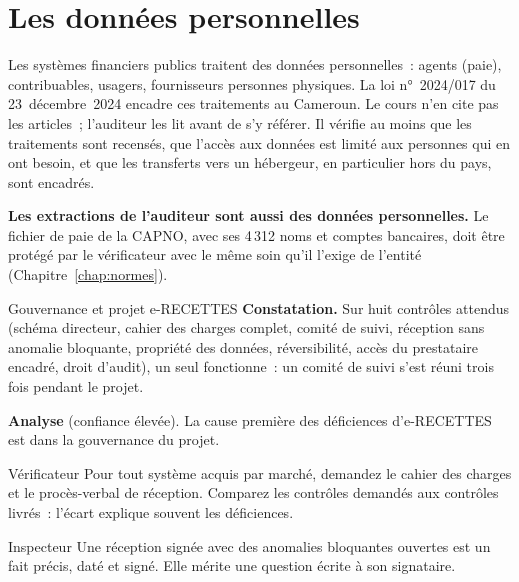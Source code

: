 \separateur

\section{Les données personnelles}
\label{sec:c13-donnees}

Les systèmes financiers publics traitent des données personnelles~: agents
(paie), contribuables, usagers, fournisseurs personnes physiques. La loi
n°~2024/017 du 23~décembre~2024 encadre ces traitements au Cameroun. Le
cours n'en cite pas les articles~; l'auditeur les lit avant de s'y
référer. Il vérifie au moins que les traitements sont recensés, que
l'accès aux données est limité aux personnes qui en ont besoin, et que
les transferts vers un hébergeur, en particulier hors du pays, sont
encadrés.

\begin{boxinfo}
\textbf{Les extractions de l'auditeur sont aussi des données
personnelles.} Le fichier de paie de la CAPNO, avec ses 4\,312 noms et
comptes bancaires, doit être protégé par le vérificateur avec le même
soin qu'il l'exige de l'entité (Chapitre~\ref{chap:normes}).
\end{boxinfo}

\begin{boxlecture}{Gouvernance et projet e-RECETTES}
\textbf{Constatation.} Sur huit contrôles attendus (schéma directeur,
cahier des charges complet, comité de suivi, réception sans anomalie
bloquante, propriété des données, réversibilité, accès du prestataire
encadré, droit d'audit), un seul fonctionne~: un comité de suivi s'est
réuni trois fois pendant le projet.

\textbf{Analyse} (confiance élevée). La cause première des déficiences
d'e-RECETTES est dans la gouvernance du projet.

\medskip
\hfill{}
\end{boxlecture}

\begin{boxmetier}{Vérificateur}
Pour tout système acquis par marché, demandez le cahier des charges et le
procès-verbal de réception. Comparez les contrôles demandés aux contrôles
livrés~: l'écart explique souvent les déficiences.
\end{boxmetier}

\begin{boxmetier}{Inspecteur}
Une réception signée avec des anomalies bloquantes ouvertes est un fait
précis, daté et signé. Elle mérite une question écrite à son signataire.
\end{boxmetier}

